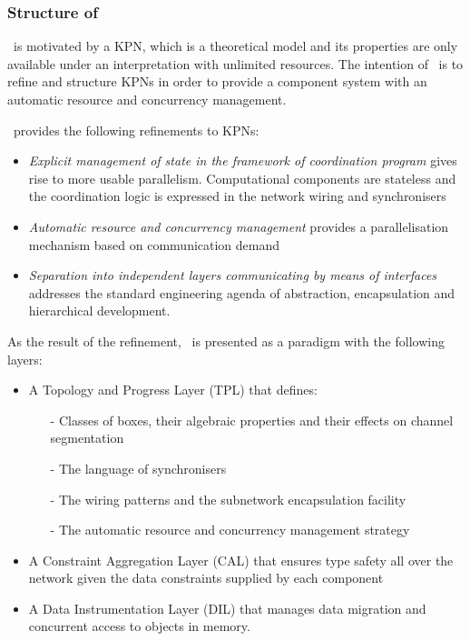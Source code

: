     \subsubsection*{Structure of \ak\ }
\ak\ is motivated by a KPN, which is a theoretical model and its properties are only available under an interpretation with unlimited resources. The intention of \ak\ is to refine and structure KPNs in order to provide a component system with an automatic resource and concurrency management.

\ak\ provides the following refinements to KPNs:
\begin{itemize}
\item \emph{Explicit management of state in the framework of coordination program} gives rise to more usable parallelism. Computational components are stateless and the coordination logic is expressed in the network wiring and synchronisers

\item \emph{Automatic resource and concurrency management} provides a parallelisation mechanism based on communication demand

\item \emph{Separation into independent layers communicating by means of interfaces} addresses the standard engineering agenda of abstraction, encapsulation and hierarchical development.
\end{itemize}

As the result of the refinement, \ak\ is presented as a paradigm with the following layers:
\begin{itemize}
\item A Topology and Progress Layer (TPL) that defines:
    \begin{itemize}
\item[-] Classes of boxes, their algebraic properties and their effects on channel segmentation
\item[-] The language of synchronisers
\item[-] The wiring patterns and the subnetwork encapsulation facility
\item[-] The automatic resource and concurrency management strategy
    \end{itemize}

\item A Constraint Aggregation Layer (CAL) that ensures type safety all over the network given the data constraints supplied by each component

\item A Data Instrumentation Layer (DIL) that manages data migration and concurrent access to objects in memory.
\end{itemize}


